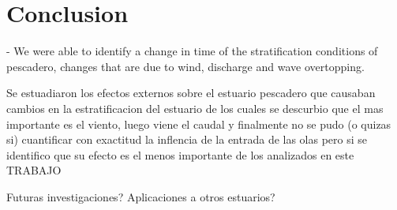 \documentclass[tesis.tex]{subfiles}
\begin{document}
  
\section{Conclusion}
- We were able to identify a change in time of the stratification conditions of pescadero, changes that are due to wind, discharge and wave overtopping.

Se estuadiaron los efectos externos sobre el estuario pescadero que causaban cambios en la estratificacion del estuario de los cuales se descurbio que el mas importante es el viento, luego viene el caudal y finalmente no se pudo (o quizas si) cuantificar con exactitud la inflencia de la entrada de las olas pero si se identifico que su efecto es el menos importante de los analizados en este TRABAJO



Futuras investigaciones?
Aplicaciones a otros estuarios?
\end{document}
